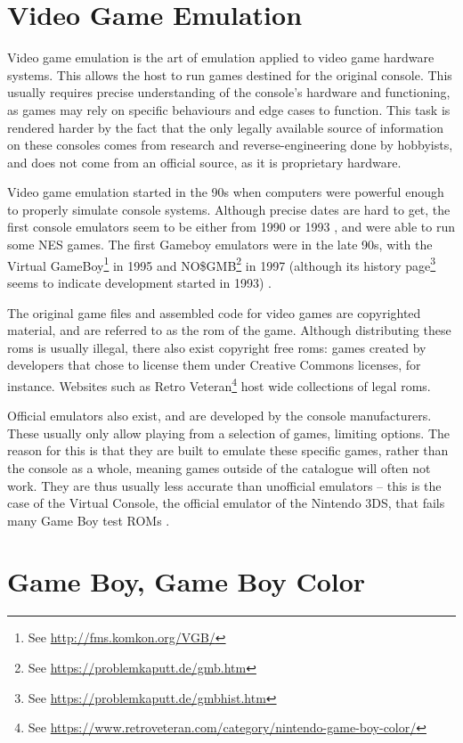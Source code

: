 \documentclass[11pt]{informatics-report}
\newcommand{\ftnt}[1]{\footnote{See \url{#1}}}
\begin{document}
\section{Video Game Emulation}

Video game emulation is the art of emulation applied to video game hardware systems. This allows the host to run games destined for the original console. This usually requires precise understanding of the console's hardware and functioning, as games may rely on specific behaviours and edge cases to function. This task is rendered harder by the fact that the only legally available source of information on these consoles comes from research and reverse-engineering done by hobbyists, and does not come from an official source, as it is proprietary hardware.

Video game emulation started in the 90s when computers were powerful enough to properly simulate console systems. Although precise dates are hard to get, the first console emulators seem to be either from 1990 or 1993 \cite{first_nes_emu}, and were able to run some NES games. The first Gameboy emulators were in the late 90s, with the Virtual GameBoy\ftnt{http://fms.komkon.org/VGB/} in 1995 and NO\$GMB\ftnt{https://problemkaputt.de/gmb.htm} in 1997 (although its history page\ftnt{https://problemkaputt.de/gmbhist.htm} seems to indicate development started in 1993) \cite{first_gb_emus}.

The original game files and assembled code for video games are copyrighted material, and are referred to as the \gls{rom} of the game. Although distributing these \glspl{rom} is usually illegal, there also exist copyright free \glspl{rom}: games created by developers that chose to license them under Creative Commons licenses, for instance. Websites such as Retro Veteran\ftnt{https://www.retroveteran.com/category/nintendo-game-boy-color/} host wide collections of legal \glspl{rom}.

Official emulators also exist, and are developed by the console manufacturers. These usually only allow playing from a selection of games, limiting options. The reason for this is that they are built to emulate these specific games, rather than the console as a whole, meaning games outside of the catalogue will often not work. They are thus usually less accurate than unofficial emulators -- this is the case of the Virtual Console, the official emulator of the Nintendo 3DS, that fails many Game Boy test ROMs \cite[Test ROMs]{gbdev_wiki}.

\section{Game Boy, Game Boy Color}
\end{document}
